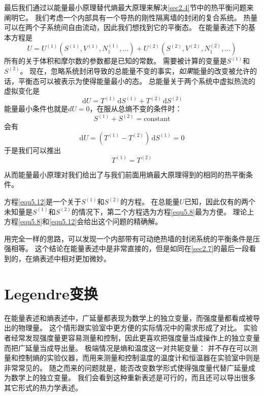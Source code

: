 最后我们通过以能量最小原理替代熵最大原理来解决\ref{sec2.4}节中的热平衡问题来阐明它。
我们考虑一个内部具有一个导热的刚性隔离墙的封闭的复合系统。
热量可以在两个子系统间自由流动，因此我们想找到它的平衡态。
在能量表述下的基本方程是
\begin{equation}
\label{equ5.8}
U=U^{(1)}(S^{(1)},V^{(1)},N^{(1)}_1,\ldots)+U^{(2)}(S^{(2)},V^{(2)},N^{(2)}_1,\ldots)
\end{equation}
所有的关于体积和摩尔数的参数都是已知的常数。
需要被计算的变量是$S^{(1)}$和$S^{(2)}$。
现在，忽略系统封闭导致的总能量不变的事实，{\it 如果}能量的改变被允许的话，平衡态可以被表示为使得能量最小的态。
总能量关于两个系统中虚拟热流的虚拟变化是
\begin{equation}
\label{equ5.9}
\,\mathrm dU=T^{(1)}\,\mathrm dS^{(1)}+T^{(2)}\,\mathrm dS^{(2)}
\end{equation}
能量最小条件也就是$dU=0$，在服从总熵不变的条件时：
\begin{equation}
\label{equ5.10}
S^{(1)}+S^{(2)}=\text{constant}
\end{equation}
会有
\begin{equation}
\label{equ5.11}
\mathrm dU=(T^{(1)}-T^{(2)})\,\mathrm dS^{(1)}=0
\end{equation}
于是我们可以推出
\begin{equation}
\label{equ5.12}
T^{(1)}=T^{(2)}
\end{equation}

从而能量最小原理对我们给出了与我们前面用熵最大原理得到的相同的热平衡条件。

方程\eqref{equ5.12}是一个关于$S^{(1)}$和$S^{(2)}$的方程。
在总能量$U$已知，因此仅有的两个未知量是$S^{(1)}$和$S^{(2)}$的情况下，第二个方程选为方程\eqref{equ5.8}最为方便。
理论上方程\eqref{equ5.8}和\eqref{equ5.12}会给出这个问题的精确解。

用完全一样的思路，可以发现一个内部带有可动绝热墙的封闭系统的平衡条件是压强相等。
这个结论在能量表述中是非常直接的，但是如同在\ref{sec2.7}的最后一段看到的，在熵表述中相对更加微妙。

\section{Legendre变换}
\label{sec5.2}

在能量表述和熵表述中，广延量都表现为数学上的独立变量，而强度量都看成被导出的物理量。
这个情形跟实验室中更方便的实际情况中的需求形成了对比。
实验者经常发现强度量更容易测量和控制，因此更喜欢把强度量当成操作上的独立变量而把广延量当成导出量。
极端情况是熵和温度这一对共轭变量：
并不存在可以测量和控制熵的实验仪器，而用来测量和控制温度的温度计和恒温器在实验室中则是非常常见的。
随之而来的问题就是，能否改变数学形式使得强度量代替广延量成为数学上的独立变量。
我们会看到这种重新表述是可行的，而且还可以导出很多其它形式的热力学表述。

